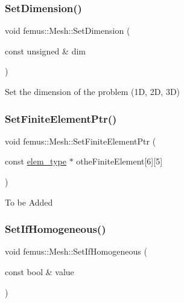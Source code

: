 \subsubsection{\texorpdfstring{Set\+Dimension()}{SetDimension()}}
{\footnotesize\ttfamily void femus\+::\+Mesh\+::\+Set\+Dimension (\begin{DoxyParamCaption}\item[{const unsigned \&}]{dim }\end{DoxyParamCaption})\hspace{0.3cm}{\ttfamily [inline]}}

Set the dimension of the problem (1D, 2D, 3D) \mbox{\label{classfemus_1_1_mesh_ae094f313c8fdcb6add08328253a009cd}} 
\subsubsection{\texorpdfstring{Set\+Finite\+Element\+Ptr()}{SetFiniteElementPtr()}}
{\footnotesize\ttfamily void femus\+::\+Mesh\+::\+Set\+Finite\+Element\+Ptr (\begin{DoxyParamCaption}\item[{const \mbox{\hyperlink{classfemus_1_1elem__type}{elem\+\_\+type}} $\ast$}]{othe\+Finite\+Element\mbox{[}6\mbox{]}\mbox{[}5\mbox{]} }\end{DoxyParamCaption})}

To be Added \mbox{\label{classfemus_1_1_mesh_a6541fc0624c76cfac3f8fa417081d41f}} 
\subsubsection{\texorpdfstring{Set\+If\+Homogeneous()}{SetIfHomogeneous()}}
{\footnotesize\ttfamily void femus\+::\+Mesh\+::\+Set\+If\+Homogeneous (\begin{DoxyParamCaption}\item[{const bool \&}]{value }\end{DoxyParamCaption})\hspace{0.3cm}{\ttfamily [inline]}}

\mbox{\label{classfemus_1_1_mesh_ad6dbe08b8fc0ba0b6f8e45c47a911ee8}} 
